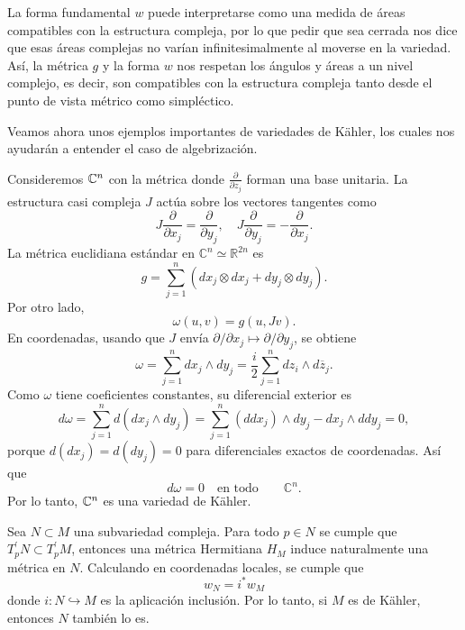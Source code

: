 La forma fundamental $w$ puede interpretarse como una medida de áreas compatibles con la estructura compleja, por lo que pedir que sea cerrada nos dice que esas áreas complejas no varían infinitesimalmente al moverse en la variedad. Así, la métrica $g$ y la forma $w$ nos respetan los ángulos y áreas a un nivel complejo, es decir, son compatibles con la estructura compleja tanto desde el punto de vista métrico como simpléctico.

Veamos ahora unos ejemplos importantes de variedades de Kähler, los cuales nos ayudarán a entender el caso de algebrización.

\begin{example}
	Consideremos $\mathbb{C}^n$ con la métrica donde $\frac{\partial}{\partial z_j}$ forman una base unitaria. La estructura casi compleja $J$ actúa sobre los vectores tangentes como
	\begin{equation*}
		J\frac{\partial}{\partial x_j}=\frac{\partial}{\partial y_j},\quad
		J\frac{\partial}{\partial y_j}=-\frac{\partial}{\partial x_j}.
	\end{equation*}
	La métrica euclidiana estándar en $\mathbb{C}^n\simeq\mathbb{R}^{2n}$ es
	\begin{equation*}
		g=\sum_{j=1}^n (dx_j\otimes dx_j+dy_j\otimes dy_j).
	\end{equation*}
	Por otro lado,
	\begin{equation*}
		\omega(u,v)=g(u,Jv).
	\end{equation*}
	En coordenadas, usando que $J$ envía $\partial/\partial x_j\mapsto\partial/\partial y_j$, se obtiene
	\begin{equation*}
		\omega=\sum_{j=1}^n dx_j\wedge dy_j=\frac{i}{2}\sum_{j=1}^{n} dz_i\wedge d\overline{z}_j.
	\end{equation*}
	Como $\omega$ tiene coeficientes constantes, su diferencial exterior es
	\begin{equation*}
		d\omega=\sum_{j=1}^n d(dx_j\wedge dy_j)=
		\sum_{j=1}^n (d dx_j)\wedge dy_j - dx_j\wedge d dy_j=0,
	\end{equation*}
	porque $d (dx_j)=d (dy_j)=0$ para diferenciales exactos de coordenadas. Así que
	\begin{equation*}
		d\omega=0\quad\text{en todo}\qquad \mathbb{C}^n.
	\end{equation*}
	Por lo tanto, $\mathbb{C}^n$ es una variedad de Kähler.
\end{example}

\begin{example}
	Sea $N\subset M$ una subvariedad compleja. Para todo $p\in N$ se cumple que $T_p^\prime N\subset T_p^\prime M$, entonces una métrica Hermitiana $H_M$ induce naturalmente una métrica en $N$. Calculando en coordenadas locales, se cumple que
	\begin{equation*}
		w_N=i^*w_M
	\end{equation*}
	donde $i:N\hookrightarrow M$ es la aplicación inclusión. Por lo tanto, si $M$ es de Kähler, entonces $N$ también lo es.
\end{example}

